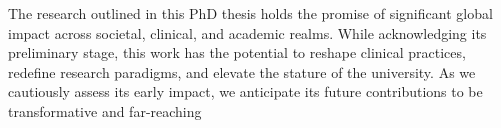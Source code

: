 


The research outlined in this PhD thesis holds the promise of significant global impact across societal, clinical, and academic realms. While acknowledging its preliminary stage, this work has the potential to reshape clinical practices, redefine research paradigms, and elevate the stature of the university. As we cautiously assess its early impact, we anticipate its future contributions to be transformative and far-reaching


